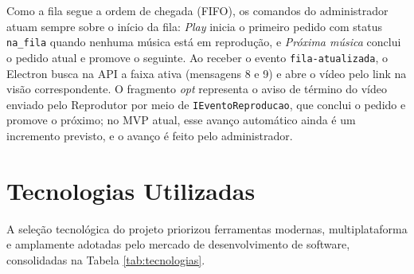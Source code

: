 Como a fila segue a ordem de chegada (FIFO), os comandos do administrador atuam sempre sobre o início da fila: \textit{Play} inicia o primeiro pedido com status \texttt{na\_fila} quando nenhuma música está em reprodução, e \textit{Próxima música} conclui o pedido atual e promove o seguinte. Ao receber o evento \texttt{fila-atualizada}, o Electron busca na API a faixa ativa (mensagens 8 e 9) e abre o vídeo pelo link na visão correspondente. O fragmento \textit{opt} representa o aviso de término do vídeo enviado pelo Reprodutor por meio de \texttt{IEventoReproducao}, que conclui o pedido e promove o próximo; no MVP atual, esse avanço automático ainda é um incremento previsto, e o avanço é feito pelo administrador.

\section{Tecnologias Utilizadas}

A seleção tecnológica do projeto priorizou ferramentas modernas, multiplataforma e amplamente adotadas pelo mercado de desenvolvimento de software, consolidadas na Tabela \ref{tab:tecnologias}.

